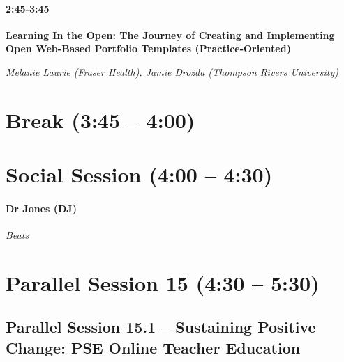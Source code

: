 \documentclass[
]{book}
\begin{document}
\begin{secondary}
\hypertarget{section}{%
\paragraph{2:45-3:45}\label{section}}

\textbf{Learning In the Open: The Journey of Creating and Implementing
Open Web-Based Portfolio Templates (Practice-Oriented)}

\emph{Melanie Laurie (Fraser Health), Jamie Drozda (Thompson Rivers
University)}
\end{secondary}

\hypertarget{break-345-400-3}{%
\section*{Break (3:45 -- 4:00)}\label{break-345-400-3}}

\hypertarget{social-session-400-430-3}{%
\section*{Social Session (4:00 -- 4:30)}\label{social-session-400-430-3}}

\begin{gh}
\hypertarget{dr-jones-dj}{%
\paragraph{Dr Jones (DJ)}\label{dr-jones-dj}}

\emph{Beats}
\end{gh}

\hypertarget{parallel-session-15-430-530}{%
\section*{Parallel Session 15 (4:30 -- 5:30)}\label{parallel-session-15-430-530}}

\hypertarget{parallel-session-15.1-sustaining-positive-change-pse-online-teacher-education}{%
\subsection*{Parallel Session 15.1 -- Sustaining Positive Change: PSE Online Teacher Education}\label{parallel-session-15.1-sustaining-positive-change-pse-online-teacher-education}}
\end{document}
